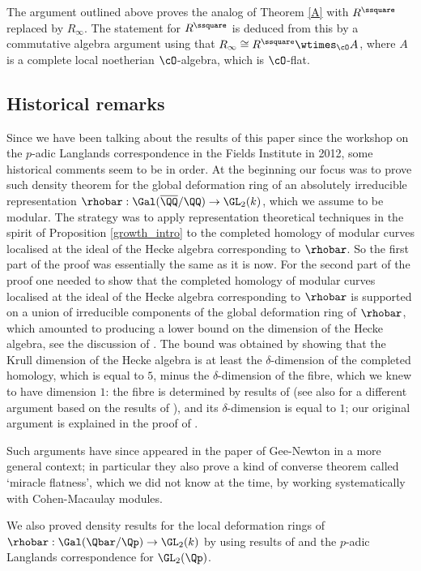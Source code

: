 The argument outlined above proves the analog of Theorem \ref{A} with $R^\ssquare$ replaced by $R_{\infty}$. The statement for $R^\ssquare$ is deduced from this by a commutative algebra argument using that $R_\infty\cong R^\ssquare\wtimes_{\cO} A$, where $A$ is a complete local noetherian $\cO$-algebra, which is $\cO$-flat.

\subsection{Historical remarks} Since we have been talking about the results of this paper
since the workshop on the $p$-adic Langlands correspondence in the Fields Institute in 2012, some historical comments seem to be in order.
At the beginning our focus was to prove such density theorem for the global deformation ring
of an absolutely irreducible representation $\rhobar: \Gal(\overline{\QQ}/ \QQ)\to \GL_2(k)$,
which we assume to be modular. The strategy was to apply representation theoretical techniques in the
spirit of Proposition \ref{growth_intro} to the completed homology of modular curves localised at the ideal of the Hecke algebra corresponding to $\rhobar$. So the first part of the proof
was essentially the same as it is now. For the second part of the proof one needed to show that the completed homology of modular curves localised at the ideal of the Hecke algebra corresponding to $\rhobar$ is supported on a union of irreducible components of the global deformation ring of $\rhobar$, which amounted to producing a lower bound on the dimension of the Hecke algebra, see the discussion of
\cite[\S 3.1.1]{matt_icm}. The bound was obtained by showing that the Krull dimension of the Hecke
algebra is at least the $\delta$-dimension of the completed homology, which is equal to $5$, minus the
$\delta$-dimension of the fibre, which we knew to have dimension $1$: the fibre is determined by results
of \cite{emfm} (see also \cite[Lem.\,5.8]{padicJL} for a different argument based on the results of
\cite{cmf}), and its $\delta$-dimension is equal to $1$; our original argument is explained in the proof of
\cite[Lem.\,5.14]{padicJL}.

Such arguments have since appeared in the paper of Gee-Newton \cite{gee-newton}
in a more general context; in particular they also prove a kind of converse theorem called `miracle flatness', which we did not know at the time, by working systematically with Cohen-Macaulay modules.

We also proved density results
for the local deformation rings of $\rhobar: \Gal(\Qbar/\Qp)\to \GL_2(k)$ by using results of \cite{cmf} and the $p$-adic Langlands correspondence for $\GL_2(\Qp)$.

